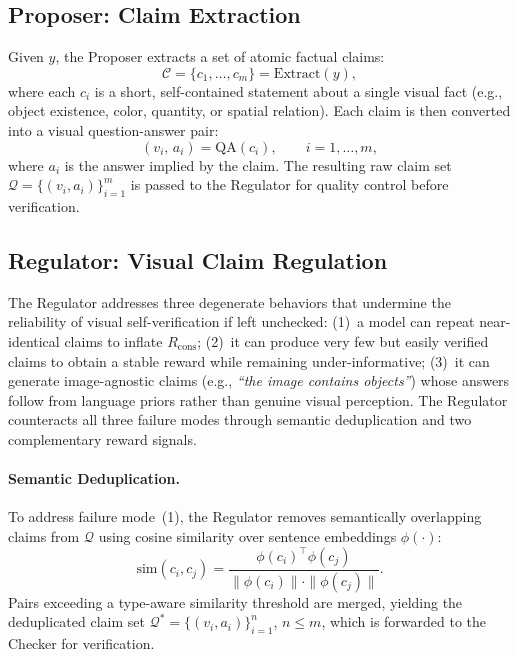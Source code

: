 \subsection{Proposer: Claim Extraction}
\label{sec:proposer}

Given $y$, the Proposer extracts a set of atomic factual
claims:
\begin{equation}
    \mathcal{C} = \{c_1, \ldots, c_m\} = \mathrm{Extract}(y),
\end{equation}
where each $c_i$ is a short, self-contained statement about a single visual
fact (e.g., object existence, color, quantity, or spatial relation).
Each claim is then converted into a visual question-answer pair:
\begin{equation}
    (v_i,\, a_i) = \mathrm{QA}(c_i),
    \qquad i = 1, \ldots, m,
\end{equation}
where $a_i$ is the answer implied by the claim.
The resulting raw claim set $\mathcal{Q} = \{(v_i, a_i)\}_{i=1}^{m}$
is passed to the Regulator for quality control before verification.


\subsection{Regulator: Visual Claim Regulation}
\label{sec:regulator}

The Regulator addresses three degenerate behaviors that undermine the
reliability of visual self-verification if left unchecked:
(1)~a model can repeat near-identical claims to inflate $R_{\mathrm{cons}}$;
(2)~it can produce very few but easily verified claims to obtain a stable
reward while remaining under-informative;
(3)~it can generate image-agnostic claims (e.g., \textit{``the image contains
objects''}) whose answers follow from language priors rather than genuine
visual perception.
The Regulator counteracts all three failure modes through semantic
deduplication and two complementary reward signals.

\paragraph{Semantic Deduplication.}
To address failure mode~(1), the Regulator removes semantically overlapping
claims from $\mathcal{Q}$ using cosine similarity over sentence embeddings
$\phi(\cdot)$:
\begin{equation}
    \mathrm{sim}(c_i, c_j)
    = \frac{\phi(c_i)^{\top} \phi(c_j)}
           {\|\phi(c_i)\| \cdot \|\phi(c_j)\|}.
\end{equation}
Pairs exceeding a type-aware similarity threshold are merged, yielding the
deduplicated claim set $\mathcal{Q}^{\ast} = \{(v_i, a_i)\}_{i=1}^{n}$,
$n \leq m$, which is forwarded to the Checker for verification.

